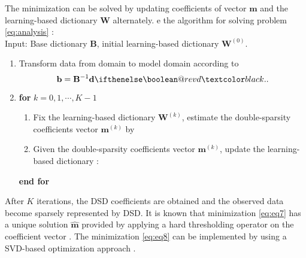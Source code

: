 The minimization can be solved by updating coefficients of vector $\mathbf{m}$ and the learning-based dictionary $\mathbf{W}$ alternately. e  the  algorithm for solving problem \ref{eq:analysis} :\\
Input: Base dictionary $\mathbf{B}$, initial learning-based dictionary $\mathbf{W}^{(0)}$.
\begin{enumerate}
\item Transform data from  domain to model domain according to\dlo{:}
\begin{equation}
\label{eq:ana}
\mathbf{b} = \mathbf{B}^{-1} \mathbf{d}\wen{.}
\end{equation}

\item \textbf{for} $k=0,1,\cdots,K-1$\wen{:}
\begin{enumerate}
\item
Fix the learning-based dictionary $\mathbf{W}^{(k)}$, estimate the double-sparsity coefficients vector $\mathbf{m}^{(k)}$ by

\item Given the double-sparsity coefficients vector $\mathbf{m}^{(k)}$, update the learning-based dictionary  :

\end{enumerate}
\textbf{end for}
\end{enumerate}
After $K$ iterations, the DSD coefficients are obtained and the observed data become sparsely represented by DSD.
It is known that minimization \ref{eq:eq7} has a unique solution $\hat{\mathbf{m}}$ provided by applying a hard thresholding operator on the coefficient vector . The minimization \ref{eq:eq8} can be implemented by using a SVD-based optimization approach  \cite[]{jianfeng2013}. 

